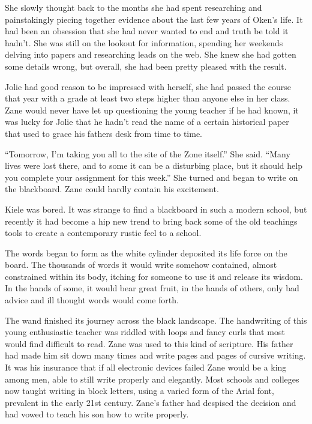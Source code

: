 She slowly thought back to the months she had spent researching and painstakingly piecing together evidence about the last few years of Oken's life.  It had been an obsession that she had never wanted to end and truth be told it hadn't.  She was still on the lookout for information, spending her weekends delving into papers and researching leads on the web.  She knew she had gotten some details wrong, but overall, she had been pretty pleased with the result.  

Jolie had good reason to be impressed with herself, she had passed the course that year with a grade at least two steps higher than anyone else in her class.  Zane would never have let up questioning the young teacher if he had known, it was lucky for Jolie that he hadn't read the name of a certain historical paper that used to grace his fathers desk from time to time.  

``Tomorrow, I'm taking you all to the site of the Zone itself.'' She said.  ``Many lives were lost there, and to some it can be a disturbing place, but it should help you complete your assignment for this week.''  She turned and began to write on the blackboard.  Zane could hardly contain his excitement.  

Kiele was bored.  It was strange to find a blackboard in such a modern school, but recently it had become a hip new trend to bring back some of the old teachings tools to create a contemporary rustic feel to a school.

The words began to form as the white cylinder deposited its life force on the board.  The thousands of words it would write somehow contained, almost constrained within its body, itching for someone to use it and release its wisdom.  In the hands of some, it would bear great fruit, in the hands of others, only bad advice and ill thought words would come forth.

The wand finished its journey across the black landscape.  The handwriting of this young enthusiastic teacher was riddled with loops and fancy curls that most would find difficult to read.  Zane was used to this kind of scripture.  His father had made him sit down many times and write pages and pages of cursive writing.  It was his insurance that if all electronic devices failed Zane would be a king among men, able to still write properly and elegantly.  Most schools and colleges now taught writing in block letters, using a varied form of the Arial font, prevalent in the early 21st century.  Zane's father had despised the decision and had vowed to teach his son how to write properly.

